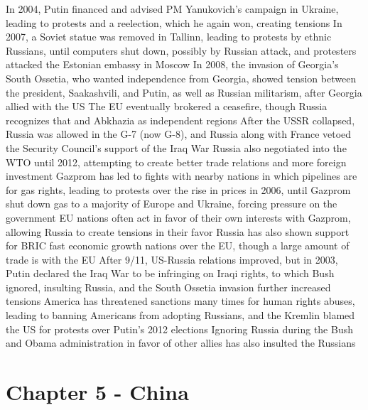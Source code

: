 \documentclass[11 pt, twoside]{article}
\newenvironment{outline*}
{
	\begin{outline}[enumerate]
	}
	{\end{outline}
}
\begin{document}
\begin{outline*}
\2 In 2004, Putin financed and advised PM Yanukovich's campaign in Ukraine, leading to protests and a reelection, which he again won, creating tensions
\2 In 2007, a Soviet statue was removed in Tallinn, leading to protests by ethnic Russians, until computers shut down, possibly by Russian attack, and protesters attacked the Estonian embassy in Moscow
\2 In 2008, the invasion of Georgia's South Ossetia, who wanted independence from Georgia, showed tension between the president, Saakashvili, and Putin, as well as Russian militarism, after Georgia allied with the US
\3 The EU eventually brokered a ceasefire, though Russia recognizes that and Abkhazia as independent regions
\2 After the USSR collapsed, Russia was allowed in the G-7 (now G-8), and Russia along with France vetoed the Security Council's support of the Iraq War
\3 Russia also negotiated into the WTO until 2012, attempting to create better trade relations and more foreign investment
\2 Gazprom has led to fights with nearby nations in which pipelines are for gas rights, leading to protests over the rise in prices in 2006, until Gazprom shut down gas to a majority of Europe and Ukraine, forcing pressure on the government
\3 EU nations often act in favor of their own interests with Gazprom, allowing Russia to create tensions in their favor
\3 Russia has also shown support for BRIC fast economic growth nations over the EU, though a large amount of trade is with the EU
\2 After 9/11, US-Russia relations improved, but in 2003, Putin declared the Iraq War to be infringing on Iraqi rights, to which Bush ignored, insulting Russia, and the South Ossetia invasion further increased tensions
\3 America has threatened sanctions many times for human rights abuses, leading to banning Americans from adopting Russians, and the Kremlin blamed the US for protests over Putin's 2012 elections
\3 Ignoring Russia during the Bush and Obama administration in favor of other allies has also insulted the Russians
\end{outline*}
\section{Chapter 5 - China}
\end{document}
